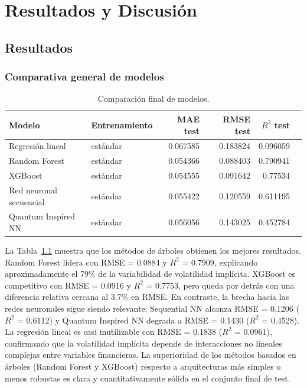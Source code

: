 
\chapter{Resultados y Discusión}
\label{chap:resultados}

\section{Resultados}
\label{sec:resultados}

\subsection{Comparativa general de modelos}
\label{subsec:comparativa-modelos}

\begin{table}[htbp]
\centering
\scriptsize
\begin{tabular}{p{}p{}rrrr}
\toprule
Modelo & Entrenamiento & MAE test & RMSE test & \(R^2\) test \\
\midrule
Regresión lineal & estándar & 0.067585 & 0.183824 & 0.096059  \\
Random Forest & estándar & 0.054366 & 0.088403 & 0.790941  \\
XGBoost & estándar & 0.054555 & 0.091642 & 0.77534  \\
Red neuronal secuencial & estándar & 0.055422 & 0.120559 & 0.611195  \\
Quantum Inspired NN & estándar & 0.056056 & 0.143025 & 0.452784  \\
\bottomrule
\end{tabular}
\caption{Comparación final de modelos.}
\label{tab:resultados-modelos}
\end{table}

La Tabla~\ref{tab:resultados-modelos} muestra que los métodos de árboles obtienen los mejores resultados. Random Forest lidera con RMSE = 0.0884 y \(R^2\) = 0.7909, explicando aproximadamente el 79\% de la variabilidad de volatilidad implícita. XGBoost es competitivo con RMSE = 0.0916 y \(R^2\) = 0.7753, pero queda por detrás con una diferencia relativa cercana al 3.7\% en RMSE. En contraste, la brecha hacia las redes neuronales sigue siendo relevante: Sequential NN alcanza RMSE = 0.1206 (\(R^2\) = 0.6112) y Quantum Inspired NN degrada a RMSE = 0.1430 (\(R^2\) = 0.4528). La regresión lineal es casi inutilizable con RMSE = 0.1838 (\(R^2\) = 0.0961), confirmando que la volatilidad implícita depende de interacciones no lineales complejas entre variables financieras. La superioridad de los métodos basados en árboles (Random Forest y XGBoost) respecto a arquitecturas más simples o menos robustas es clara y cuantitativamente sólida en el conjunto final de test.

